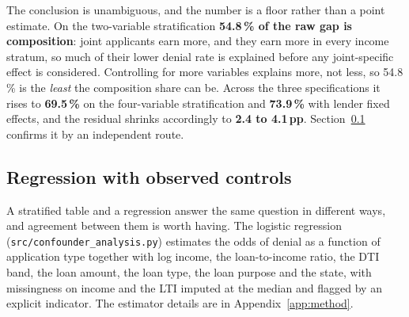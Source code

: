 \documentclass[sigconf,balance=false]{acmart}
\begin{document}
The conclusion is unambiguous, and the number is a floor rather than a
point estimate. On the two-variable stratification \textbf{54.8\,\% of the
raw gap is composition}: joint applicants earn more, and they earn more in
every income stratum, so much of their lower denial rate is explained
before any joint-specific effect is considered. Controlling for more
variables explains more, not less, so 54.8\,\% is the \emph{least} the
composition share can be. Across the three specifications it rises to
\textbf{69.5\,\%} on the four-variable stratification and
\textbf{73.9\,\%} with lender fixed effects, and the residual shrinks
accordingly to \textbf{2.4 to 4.1\,pp}.
Section~\ref{sec:confounding:regression} confirms it by an independent
route.

\subsection{Regression with observed controls}
\label{sec:confounding:regression}

A stratified table and a regression answer the same question in different
ways, and agreement between them is worth having. The logistic regression
(\texttt{src/confounder\_\allowbreak analysis.py}) estimates the odds of
denial as a function of application type together with log income, the
loan-to-income ratio, the DTI band, the loan amount, the loan type, the
loan purpose and the state, with missingness on income and the LTI imputed
at the median and flagged by an explicit indicator. The estimator details
are in Appendix~\ref{app:method}.
\end{document}
